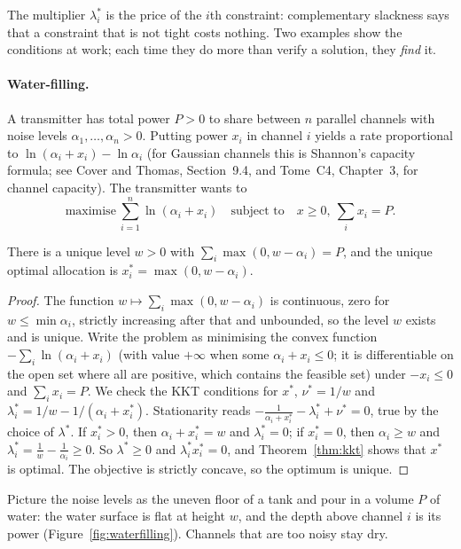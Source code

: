 The multiplier $\lambda_i^*$ is the price of the $i$th constraint: complementary slackness says that a constraint that is not tight costs nothing. Two examples show the
conditions at work; each time they do more than verify a solution, they \emph{find} it.

\paragraph{Water-filling.} A transmitter has total power $P>0$ to share between $n$ parallel channels with noise levels $\alpha_1,\dots,\alpha_n>0$. Putting power
$x_i$ in channel $i$ yields a rate proportional to $\ln(\alpha_i+x_i)-\ln\alpha_i$ (for Gaussian channels this is Shannon's capacity formula; see Cover and Thomas, Section~9.4,
and Tome~C4, Chapter~3, for channel capacity). The transmitter wants to
\[
\text{maximise}\ \sum_{i=1}^n\ln(\alpha_i+x_i)\quad\text{subject to}\quad x\ge0,\ \sum_ix_i=P.
\]

\begin{proposition}\label{prop:waterfilling}
There is a unique level $w>0$ with $\sum_i\max(0,w-\alpha_i)=P$, and the unique optimal allocation is $x_i^*=\max(0,w-\alpha_i)$.
\end{proposition}
\begin{proof}
The function $w\mapsto\sum_i\max(0,w-\alpha_i)$ is continuous, zero for $w\le\min\alpha_i$, strictly increasing after that and unbounded, so the level $w$ exists and is unique. Write the
problem as minimising the convex function $-\sum_i\ln(\alpha_i+x_i)$ (with value $+\infty$ when some $\alpha_i+x_i\le0$; it is differentiable on the open set where all are positive, which
contains the feasible set) under $-x_i\le0$ and $\sum_ix_i=P$. We check the KKT conditions for $x^*$, $\nu^*=1/w$ and $\lambda_i^*=1/w-1/(\alpha_i+x_i^*)$. Stationarity reads
$-\frac1{\alpha_i+x_i^*}-\lambda_i^*+\nu^*=0$, true by the choice of $\lambda^*$. If $x_i^*>0$, then $\alpha_i+x_i^*=w$ and $\lambda_i^*=0$; if $x_i^*=0$, then $\alpha_i\ge w$ and
$\lambda_i^*=\frac1w-\frac1{\alpha_i}\ge0$. So $\lambda^*\ge0$ and $\lambda_i^*x_i^*=0$, and Theorem~\ref{thm:kkt} shows that $x^*$ is optimal. The objective is strictly concave, so the optimum is
unique.
\end{proof}

Picture the noise levels as the uneven floor of a tank and pour in a volume $P$ of water: the water surface is flat at height $w$, and the depth above channel $i$
is its power (Figure~\ref{fig:waterfilling}). Channels that are too noisy stay dry.

